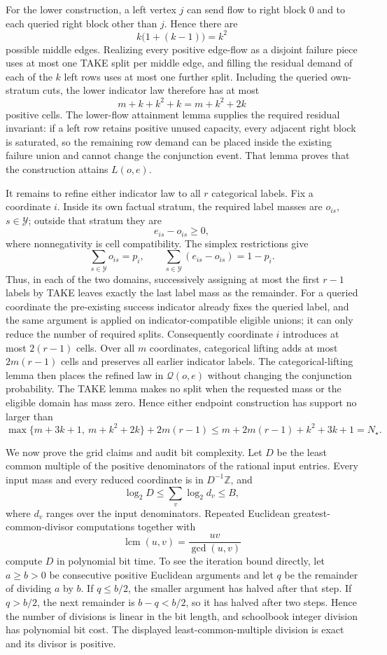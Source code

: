 For the lower construction, a left vertex \(j\) can send flow to right block \(0\) and to each queried right block other than \(j\).  Hence there are
\[
k\bigl(1+(k-1)\bigr)=k^2
\]
possible middle edges.  Realizing every positive edge-flow as a disjoint failure piece uses at most one TAKE split per middle edge, and filling the residual demand of each of the \(k\) left rows uses at most one further split.  Including the queried own-stratum cuts, the lower indicator law therefore has at most
\[
m+k+k^2+k=m+k^2+2k
\]
positive cells.  The lower-flow attainment lemma supplies the required residual invariant: if a left row retains positive unused capacity, every adjacent right block is saturated, so the remaining row demand can be placed inside the existing failure union and cannot change the conjunction event.  That lemma proves that the construction attains \(L(o,e)\).

It remains to refine either indicator law to all \(r\) categorical labels.  Fix a coordinate \(i\).  Inside its own factual stratum, the required label masses are \(o_{is}\), \(s\in\mathcal Y\); outside that stratum they are
\[
e_{is}-o_{is}\geq0,
\]
where nonnegativity is cell compatibility.  The simplex restrictions give
\[
\sum_{s\in\mathcal Y}o_{is}=p_i,
\qquad
\sum_{s\in\mathcal Y}(e_{is}-o_{is})=1-p_i.
\]
Thus, in each of the two domains, successively assigning at most the first \(r-1\) labels by TAKE leaves exactly the last label mass as the remainder.  For a queried coordinate the pre-existing success indicator already fixes the queried label, and the same argument is applied on indicator-compatible eligible unions; it can only reduce the number of required splits.  Consequently coordinate \(i\) introduces at most \(2(r-1)\) cells.  Over all \(m\) coordinates, categorical lifting adds at most \(2m(r-1)\) cells and preserves all earlier indicator labels.  The categorical-lifting lemma then places the refined law in \(\mathcal Q(o,e)\) without changing the conjunction probability.  The TAKE lemma makes no split when the requested mass or the eligible domain has mass zero.  Hence either endpoint construction has support no larger than
\[
\max\{m+3k+1,\ m+k^2+2k\}+2m(r-1)
\leq m+2m(r-1)+k^2+3k+1=N_\star.
\]

We now prove the grid claims and audit bit complexity.  Let \(D\) be the least common multiple of the positive denominators of the rational input entries.  Every input mass and every reduced coordinate is in \(D^{-1}\mathbb Z\), and
\[
\log_2D
\leq\sum_{v}\log_2 d_v
\leq B,
\]
where \(d_v\) ranges over the input denominators.  Repeated Euclidean greatest-common-divisor computations together with
\[
\operatorname{lcm}(u,v)=\frac{uv}{\gcd(u,v)}
\]
compute \(D\) in polynomial bit time.  To see the iteration bound directly, let \(a\geq b>0\) be consecutive positive Euclidean arguments and let \(q\) be the remainder of dividing \(a\) by \(b\).  If \(q\leq b/2\), the smaller argument has halved after that step.  If \(q>b/2\), the next remainder is \(b-q<b/2\), so it has halved after two steps.  Hence the number of divisions is linear in the bit length, and schoolbook integer division has polynomial bit cost.  The displayed least-common-multiple division is exact and its divisor is positive.


